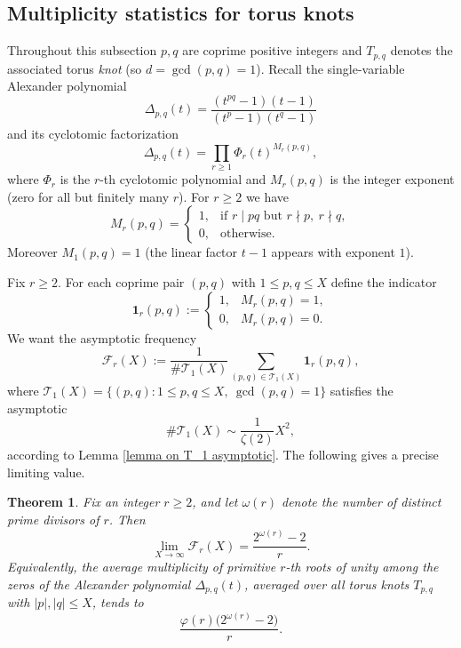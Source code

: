 \documentclass[table]{amsart}
\newtheorem{theorem}{Theorem}[section]
\numberwithin{equation}{section}
\begin{document}
\subsection{Multiplicity statistics for torus knots}
\par Throughout this subsection \(p,q\) are coprime positive integers and
\(T_{p,q}\) denotes the associated torus \emph{knot} (so \(d=\gcd(p,q)=1\)).
Recall the single-variable Alexander polynomial
\[
\Delta_{p,q}(t)=\frac{(t^{pq}-1)(t-1)}{(t^p-1)(t^q-1)}
\]
and its cyclotomic factorization
\[
\Delta_{p,q}(t)=\prod_{r\ge1} \Phi_r(t)^{M_r(p,q)},
\]
where \(\Phi_r\) is the \(r\)-th cyclotomic polynomial and \(M_r(p,q)\) is the integer exponent (zero for all but finitely many \(r\)). For \(r\ge2\) we have
\[
M_r(p,q)=
\begin{cases}
1, &\text{if } r\mid pq \text{ but } r\nmid p,\ r\nmid q,\\[4pt]
0, &\text{otherwise.}
\end{cases}
\]
\noindent Moreover \(M_1(p,q)=1\) (the linear factor \(t-1\) appears with exponent \(1\)).
\par Fix \(r\ge2\). For each coprime pair \((p,q)\) with \(1\le p,q\le X\) define
the indicator
\[
\mathbf{1}_r(p,q) := \begin{cases}1,& M_r(p,q)=1,\\ 0,& M_r(p,q)=0.\end{cases}
\]
We want the asymptotic frequency
\[
\mathcal{F}_r(X) := \frac{1}{\#\mathcal{T}_1(X)}\sum_{(p,q)\in\mathcal{T}_1(X)} \mathbf{1}_r(p,q),
\]
where \(\mathcal{T}_1(X)=\{(p,q):1\le p,q\le X,\ \gcd(p,q)=1\}\) satisfies the asymptotic 
\[
\#\mathcal{T}_1(X) \sim \frac{1}{\zeta(2)}X^2,\] according to Lemma \ref{lemma on T_1 asymptotic}. The following
gives a precise limiting value.

\begin{theorem}\label{thm:avg-Mr}
Fix an integer \(r \ge 2\), and let \(\omega(r)\) denote the number of distinct prime divisors of \(r\). Then
\[
\lim_{X\to\infty} \mathcal{F}_r(X) = \frac{2^{\omega(r)} - 2}{r}.
\]
Equivalently, the average multiplicity of primitive \(r\)-th roots of unity among the zeros of the Alexander polynomial \(\Delta_{p,q}(t)\), averaged over all torus knots \(T_{p,q}\) with \(|p|,|q|\le X\), tends to
\[
\frac{\varphi(r)\bigl(2^{\omega(r)} - 2\bigr)}{r}.
\]
\end{theorem}
\end{document}
